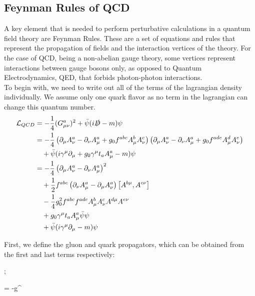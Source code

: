\subsection{Feynman Rules of QCD}
A key element that is needed to perform perturbative calculations in a quantum field theory are Feynman Rules. These are a set of equations and rules that represent the propagation of fields and the interaction vertices of the theory. For the case of QCD, being a non-abelian gauge theory, some vertices represent interactions between gauge bosons only, as opposed to Quantum Electrodynamics, QED, that forbids photon-photon interactions. \\
To begin with, we need to write out all of the terms of the lagrangian density individually. We assume only one quark flavor as no term in the lagrangian can change this quantum number.
\begin{align}\nonumber
    \mathcal{L}_{QCD} &= -\frac{1}{4}(G_{\mu\nu}^a)^2 +\bar{\psi}(i\slashed{D} - m)\psi \\\nonumber
    &= -\frac{1}{4}\left( \partial_\mu A_\nu^a - \partial_\nu A_\mu^a + g_0f^{abc}A_\mu^b A_\nu^c \right) \left(\partial_\mu A_\nu^a - \partial_\nu A_\mu^a + g_0f^{ade}A_\mu^d A_\nu^e \right) \\\nonumber
    &~~~+ \bar{\psi}(i\gamma^\mu \partial_\mu  + g_0\gamma^\mu t_aA_\mu^a - m)\psi \\\nonumber
    &= -\frac{1}{4}\left(\partial_\mu A_\nu^a - \partial_\nu A_\mu^a\right)^2 \\\nonumber
    &~~~+ \frac{1}{2}f^{abc}\left(\partial_\nu A^a_\mu - \partial_\mu A^a_\nu \right)\left[ A^{b\mu}, A^{c\nu} \right] \\
    &~~~-\frac{1}{4}g_0^2f^{abc}f^{ade}A_\mu^bA_\nu^cA^{d\mu}A^{e\nu} \label{lagr:expanded}  \\\nonumber
    &~~~+g_0\gamma^\mu t_a A_\mu^a \bar{\psi}\psi \\\nonumber
    &~~~+ \bar{\psi}(i\gamma^\mu\partial_\mu - m)\psi
\end{align}

First, we define the gluon and quark propagators, which can be obtained from the first and last terms respectively:

\begin{minipage}{0.4\textwidth}
\begin{center}
    ; 
\end{center}
\end{minipage}
\begin{minipage}{0.58\textwidth}
        \beq \nonumber = -g^{\mu\nu} ~~~~~~~~~~~~~~~~~~~~~~~~~~~\eeq
\end{minipage}


